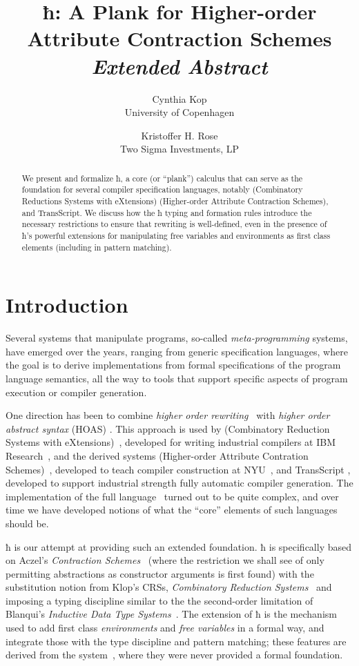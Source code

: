 \documentclass[letterpaper,10pt]{proc}
\title{ ħ: A Plank for Higher-order Attribute Contraction Schemes \\ \emph{Extended Abstract} }
\author{%
  Cynthia Kop \\
  University of Copenhagen
  \and
  Kristoffer H. Rose \\
  Two Sigma Investments, LP
}
\begin{document}
\maketitle

\begin{abstract}\noindent
  We present and formalize ħ, a core (or ``plank'') calculus that can serve as the foundation
  for several compiler specification languages, notably \CRSX (Combinatory Reductions Systems with
  eXtensions) \HAX (Higher-order Attribute Contraction Schemes), and \textsf{TransScript}.
  We discuss how the ħ typing and formation rules introduce the necessary restrictions to
  ensure that rewriting is well-defined, even in the presence of ħ's powerful extensions for
  manipulating free variables and environments as first class elements (including in pattern
  matching).
\end{abstract}


\section{Introduction}\label{sec:intro}

Several systems that manipulate programs, so-called \emph{meta-programming} systems, have emerged
over the years, ranging from generic specification languages, where the goal is to derive
implementations from formal specifications of the program language semantics, all the way to tools
that support specific aspects of program execution or compiler generation.

One direction has been to combine \emph{higher order rewriting}~\cite{Jouannaud:klop2005} with
\emph{higher order abstract syntax} (HOAS) \cite{PfenningElliot:pldi1988}. This approach is used by
\CRSX (Combinatory Reduction Systems with eXtensions)~\cite{Rose:1996}, developed for writing
industrial compilers at IBM Research~\cite{Rose:rta2011}, and the derived systems \HAX (Higher-order
Attribute Contration Schemes)~\cite{Rose:ts2015}, developed to teach compiler construction at
NYU~\cite{RoseRose:cims2015}, and \textsf{TransScript} \cite{}, developed to support industrial
strength fully automatic compiler generation.  The implementation of the full \CRSX
language~\cite{crsx} turned out to be quite complex, and over time we have developed notions of what
the ``core'' elements of such languages should be.

ħ is our attempt at providing such an extended foundation.  ħ is specifically based on Aczel's
\emph{Contraction Schemes}~\cite{Aczel:1978} (where the restriction we shall see of only permitting
abstractions as constructor arguments is first found) with the substitution notion from Klop's CRSs,
\emph{Combinatory Reduction Systems}~\cite{Klop+:tcs1993} and imposing a typing discipline similar
to the the second-order limitation of Blanqui's \emph{Inductive Data Type
  Systems}~\cite{BlanquiJouannaudOkada:tcs2002}. The extension of ħ is the mechanism used to add
first class \emph{environments} and \emph{free variables} in a formal way, and integrate those with
the type discipline and pattern matching; these features are derived from the \CRSX
system~\cite{Rose:rta2011}, where they were never provided a formal foundation.
\end{document}
